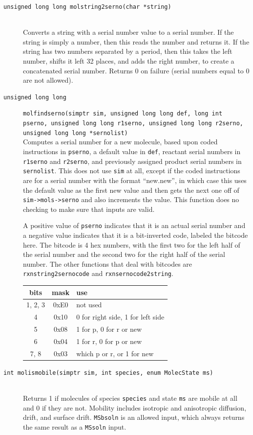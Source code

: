 \documentclass {scrbook}
\newcommand {\ttt} {\texttt}
\begin{document}
\begin{description}
\item[\ttt{unsigned long long molstring2serno(char *string)}]
\hfill \\
Converts a string with a serial number value to a serial number. If the string is simply a number, then this reads the number and returns it. If the string has two numbers separated by a period, then this takes the left number, shifts it left 32 places, and adds the right number, to create a concatenated serial number. Returns 0 on failure (serial numbers equal to 0 are not allowed).

\item[\ttt{unsigned long long}]
\ttt{molfindserno(simptr sim, unsigned long long def, long int pserno, unsigned long long r1serno, unsigned long long r2serno, unsigned long long *sernolist)}
\hfill \\
Computes a serial number for a new molecule, based upon coded instructions in \ttt{pserno}, a default value in \ttt{def}, reactant serial numbers in \ttt{r1serno} and \ttt{r2serno}, and previously assigned product serial numbers in \ttt{sernolist}. This does not use \ttt{sim} at all, except if the coded instructions are for a serial number with the format ``new.new'', in which case this uses the default value as the first new value and then gets the next one off of \ttt{sim->mols->serno} and also increments the value. This function does no checking to make sure that inputs are valid.

A positive value of \ttt{pserno} indicates that it is an actual serial number and a negative value indicates that it is a bit-inverted code, labeled the bitcode here. The bitcode is 4 hex numbers, with the first two for the left half of the serial number and the second two for the right half of the serial number. The other functions that deal with bitcodes are \ttt{rxnstring2sernocode} and \ttt{rxnsernocode2string}.

\begin{longtable}[c]{ccl}
bits & mask & use\\
\hline
1, 2, 3 & 0xE0 & not used\\
4 & 0x10 & 0 for right side, 1 for left side\\
5 & 0x08 & 1 for p, 0 for r or new\\
6 & 0x04 & 1 for r, 0 for p or new\\
7, 8 & 0x03 & which p or r, or 1 for new
\end{longtable}

\item[\ttt{int molismobile(simptr sim, int species, enum MolecState ms)}]
\hfill \\
Returns 1 if molecules of species \ttt{species} and state \ttt{ms} are mobile at all and 0 if they are not. Mobility includes isotropic and anisotropic diffusion, drift, and surface drift. \ttt{MSbsoln} is an allowed input, which always returns the same result as a \ttt{MSsoln} input.


\end{description}
\end{document}
